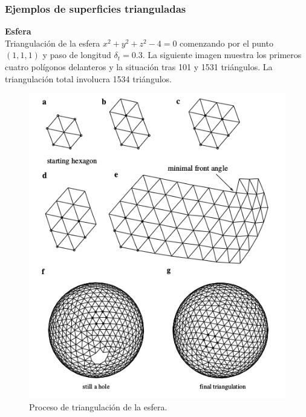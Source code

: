 \subsubsection{Ejemplos de superficies trianguladas}

\textbf{Esfera}
\[\]
Triangulación de la esfera $x^2 + y^2 + z^2 - 4 = 0$ comenzando por el punto $(1,1,1)$ y paso de longitud $\delta_t = 0.3$. La siguiente imagen muestra los primeros cuatro polígonos delanteros y la situación tras 101 y 1531 triángulos. La triangulación total involucra 1534 triángulos.
\[\]
\begin{figure}[h]
\centering
\includegraphics[scale=0.7]{images/hartmann6.png}
\caption{Proceso de triangulación de la esfera.}
\end{figure}

